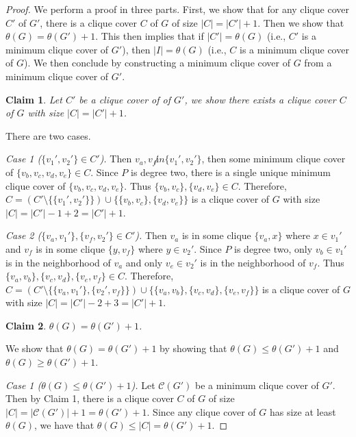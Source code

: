 \documentclass[../techreport.tex]{subfiles}
\begin{document}
\newtheorem{claim2}{Claim}

\begin{proof}
	We perform a proof in three parts. First, we show that for any clique cover $C'$ of $G'$, there is a clique cover $C$ of $G$ of size $|C| = |C'| + 1$. Then we show that $\theta(G) = \theta(G') + 1$. This then implies that if $|C'| = \theta(G)$ (i.e., $C'$ is a minimum clique cover of $G'$), then $|I| = \theta(G)$ (i.e., $C$ is a minimum clique cover of $G$). We then conclude by constructing a minimum clique cover of $G$ from a minimum clique cover of $G'$.

	\begin{claim2} 
		Let $C'$ be a clique cover of of $G'$, we show there exists a clique cover $C$ of $G$ with size $|C| = |C'| + 1$.
	\end{claim2}
	There are two cases.

	\noindent\emph{Case 1 ($\{v_1', v_2'\} \in C'$).} Then $v_a, v_f \not in \{v_1', v_2'\}$, then some minimum clique cover of $\{v_b, v_c, v_d, v_e\} \in C$. Since $P$ is degree two, there is a single unique minimum clique cover of $\{v_b, v_c, v_d, v_e\}$. Thus $\{v_b, v_c\}, \{v_d, v_e\} \in C$. Therefore, $C = (C' \setminus \{\{v_1', v_2'\}\}) \cup \{\{v_b, v_c\}, \{v_d, v_e\}\}$ is a clique cover of $G$ with size $|C| = |C'| - 1 + 2 = |C'| + 1$.

	\noindent\emph{Case 2 ($\{v_a, v_1'\}, \{v_f, v_2'\} \in C'$).} Then $v_a$ is in some clique $\{v_a, x\}$ where $x \in v_1'$ and $v_f$ is in some clique $\{y, v_f\}$ where $y \in v_2'$. Since $P$ is degree two, only $v_b \in v_1'$ is in the neighborhood of $v_a$ and only $v_e \in v_2'$ is in the neighborhood of $v_f$. Thus $\{v_a, v_b\}, \{v_c, v_d\}, \{v_e, v_f\} \in C$. Therefore, $C = (C' \setminus \{\{v_a, v_1'\}, \{v_2', v_f\}\}) \cup \{\{v_a, v_b\}, \{v_c, v_d\}, \{v_e, v_f\}\}$ is a clique cover of $G$ with size $|C| = |C'| - 2 + 3 = |C'| + 1$.

	\begin{claim2}
		$\theta(G) = \theta(G') + 1$.
	\end{claim2}
	We show that $\theta(G) = \theta(G') + 1$ by showing that $\theta(G) \leq \theta(G') + 1$ and $\theta(G) \geq \theta(G') + 1$.

	\noindent\emph{Case 1 ($\theta(G) \leq \theta(G') + 1$).} Let $\mathcal{C}(G')$ be a minimum clique cover of $G'$. Then by Claim 1, there is a clique cover $C$ of $G$ of size $|C| = |\mathcal{C}(G')| + 1 = \theta(G') + 1$. Since any clique cover of $G$ has size at least $\theta(G)$, we have that $\theta(G) \leq |C| = \theta(G') + 1$. 


\end{proof}
\end{document}
